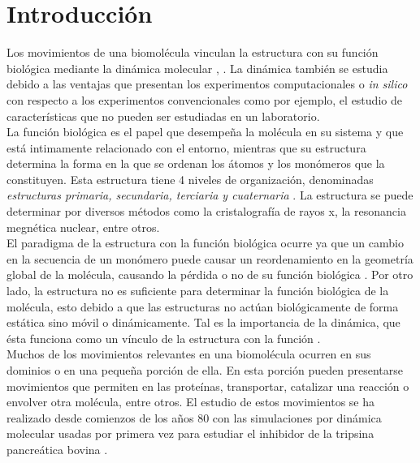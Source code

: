 \chapter*{Introducci\'{o}n}\label{ch:1}
Los movimientos de una biomol\'{e}cula vinculan la estructura con su funci\'{o}n biol\'{o}gica mediante la din\'{a}mica molecular \cite{Lezon2009}, \cite{Rader2006}. La din\'{a}mica tambi\'{e}n se estudia debido a las ventajas que presentan los experimentos computacionales o \textit{in silico} con respecto a los experimentos convencionales como por ejemplo, el estudio de caracter\'{i}sticas que no pueden ser estudiadas en un laboratorio.\\

La funci\'{o}n biol\'{o}gica es el papel que desempe\~{n}a la mol\'{e}cula en su sistema y que est\'{a} intimamente relacionado con el entorno, mientras que su estructura determina la forma en la que se ordenan los \'{a}tomos y los mon\'{o}meros que la constituyen. Esta estructura tiene 4 niveles de organizaci\'{o}n, denominadas \textit{estructuras primaria, secundaria, terciaria y cuaternaria} \cite{Kuchel}. La estructura se puede determinar por diversos m\'{e}todos como la cristalograf\'{i}a de rayos x, la resonancia megn\'{e}tica nuclear, entre otros.\\

El paradigma de la estructura con la funci\'{o}n biol\'{o}gica ocurre ya que un cambio en la secuencia de un mon\'{o}mero puede causar un reordenamiento en la geometr\'{i}a global de la mol\'{e}cula, causando la p\'{e}rdida o no de su funci\'{o}n biol\'{o}gica \cite{Dykeman2010}. Por otro lado, la estructura no es suficiente para determinar la funci\'{o}n biol\'{o}gica de la mol\'{e}cula, esto debido a que las estructuras no act\'{u}an biol\'{o}gicamente de forma est\'{a}tica sino m\'{o}vil o din\'{a}micamente. Tal es  la importancia de la din\'{a}mica, que \'{e}sta funciona como un v\'{i}nculo de la estructura con la funci\'{o}n \cite{Bahar2005Coarse-grainedBiology}.\\

Muchos de los movimientos relevantes en una biomol\'{e}cula ocurren en sus dominios o en una peque\~{n}a porci\'{o}n de ella. En esta porci\'{o}n pueden presentarse movimientos que permiten en las prote\'{i}nas, transportar, catalizar una reacci\'{o}n o envolver otra mol\'{e}cula, entre otros. El estudio de estos movimientos se ha realizado desde comienzos de los a\~{n}os 80 con las simulaciones por din\'{a}mica molecular usadas por primera vez para estudiar el inhibidor de la tripsina pancre\'{a}tica bovina  \cite{Bahar2005Coarse-grainedBiology}.\\

